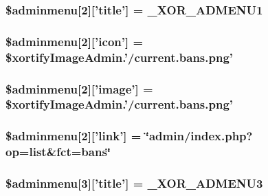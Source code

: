 \hypertarget{menu_8php_a0786c93d1375203e0020cc121fe02068}{
\subsubsection[{\$adminmenu}]{\setlength{\rightskip}{0pt plus 5cm}\$adminmenu\mbox{[}2\mbox{]}\mbox{[}'title'\mbox{]} = {\bf \-\_\-\-X\-O\-R\-\_\-\-A\-D\-M\-E\-N\-U1}}}\label{menu_8php_a0786c93d1375203e0020cc121fe02068}
\hypertarget{menu_8php_a0f5b9b0199b46370782c408755cad310}{
\subsubsection[{\$adminmenu}]{\setlength{\rightskip}{0pt plus 5cm}\$adminmenu\mbox{[}2\mbox{]}\mbox{[}'icon'\mbox{]} = \$xortify\-Image\-Admin.'/current.\-bans.\-png'}}\label{menu_8php_a0f5b9b0199b46370782c408755cad310}
\hypertarget{menu_8php_ae2b4c511406ecfc8cb23eeba3cef2959}{
\subsubsection[{\$adminmenu}]{\setlength{\rightskip}{0pt plus 5cm}\$adminmenu\mbox{[}2\mbox{]}\mbox{[}'image'\mbox{]} = \$xortify\-Image\-Admin.'/current.\-bans.\-png'}}\label{menu_8php_ae2b4c511406ecfc8cb23eeba3cef2959}
\hypertarget{menu_8php_a5f30f443311414593df5a4ae2c7501c8}{
\subsubsection[{\$adminmenu}]{\setlength{\rightskip}{0pt plus 5cm}\$adminmenu\mbox{[}2\mbox{]}\mbox{[}'link'\mbox{]} = \char`\"{}admin/index.\-php?op=list\&fct=bans\char`\"{}}}\label{menu_8php_a5f30f443311414593df5a4ae2c7501c8}
\hypertarget{menu_8php_ad27660fd5d267f334743070c732b1286}{
\subsubsection[{\$adminmenu}]{\setlength{\rightskip}{0pt plus 5cm}\$adminmenu\mbox{[}3\mbox{]}\mbox{[}'title'\mbox{]} = {\bf \-\_\-\-X\-O\-R\-\_\-\-A\-D\-M\-E\-N\-U3}}}\label{menu_8php_ad27660fd5d267f334743070c732b1286}
